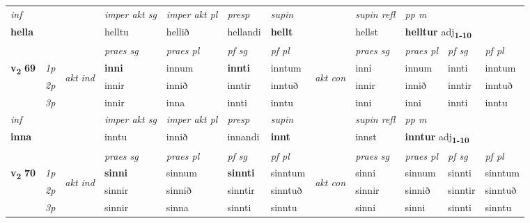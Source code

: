 \begin{longtable}[l]{X>{\footnotesize\itshape}llXXXXlXXXX}
\cmidrule{4-7}
   {\textit{inf}} & &  & \textit{imper akt sg} & \textit{imper akt pl}   & \textit{presp} & \textit{supin} && \textit{supin refl} & \textit{pp m} \\*
  {\textbf{hella}} & && helltu  & hellið   & hellandi &  \textbf{hellt} && hellst & \multicolumn{2}{l}{\textbf{helltur} adj\textbf{\textsubscript{1-10}}} \\*

\midrule

 & &   & \textit{praes sg}  & \textit{praes pl}    & \textit{ pf sg} & \textit{pf pl} & & \textit{praes sg}  & \textit{praes pl}    & \textit{pf sg} & \textit{pf pl }  \\ \cmidrule{4-7} \cmidrule{9-12}
 \multirow{2}{*}{{{\textbf{v{\textsubscript{2}}} \Large{\textbf{69}}}}}  & 1p & \multirow{3}{*}{\begin{turn}{90}\textit{akt ind}\end{turn}} & \textbf{inni} & innum & \textbf{innti} & inntum & \multirow{3}{*}{\begin{turn}{90}\textit{akt con}\end{turn}} &inni & innum & innti & inntum\\*
 & 2p &  &  innir  & innið & inntir & inntuð & & innir & innið & inntir & inntuð \\*
 & 3p &  & innir & inna & innti & inntu & & inni & inni& innti & inntu \\*
\cmidrule{4-7} \cmidrule{9-12}

   {\textit{inf}} & &  & \textit{imper akt sg} & \textit{imper akt pl}   & \textit{presp} & \textit{supin} && \textit{supin refl} & \textit{pp m} \\*
  {\textbf{inna}} & && inntu  & innið   & innandi &  \textbf{innt} && innst & \multicolumn{2}{l}{\textbf{inntur} adj\textbf{\textsubscript{1-10}}} \\*

\midrule

 & &   & \textit{praes sg}  & \textit{praes pl}    & \textit{ pf sg} & \textit{pf pl} & & \textit{praes sg}  & \textit{praes pl}    & \textit{pf sg} & \textit{pf pl }  \\ \cmidrule{4-7} \cmidrule{9-12}
 \multirow{2}{*}{{{\textbf{v{\textsubscript{2}}} \Large{\textbf{70}}}}}  & 1p & \multirow{3}{*}{\begin{turn}{90}\textit{akt ind}\end{turn}} & \textbf{sinni} & sinnum & \textbf{sinnti} & sinntum & \multirow{3}{*}{\begin{turn}{90}\textit{akt con}\end{turn}} &sinni & sinnum & sinnti & sinntum\\*
 & 2p &  &  sinnir  & sinnið & sinntir & sinntuð & & sinnir & sinnið & sinntir & sinntuð \\*
 & 3p &  & sinnir & sinna & sinnti & sinntu & & sinni & sinni& sinnti & sinntu \\*
\cmidrule{4-7} \cmidrule{9-12}


\end{longtable}
